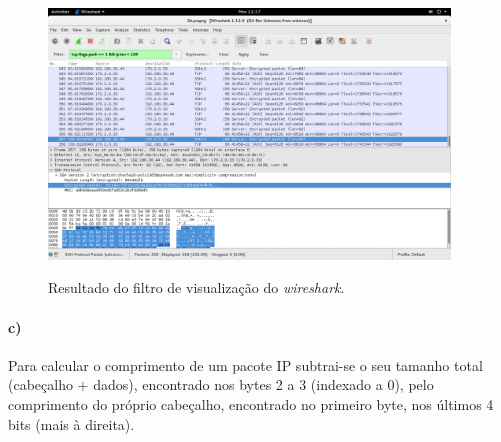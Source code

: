 \begin{figure}[h]
\centering
\includegraphics[width=0.95\textwidth, height=0.5\textheight]{3_b_screenshot.png}
\label{fig:wireshark}
\caption{Resultado do filtro de visualização do \emph{wireshark}.}
\end{figure}

\paragraph{c)}
Para calcular o comprimento de um pacote IP subtrai-se o seu tamanho total (cabeçalho + dados), encontrado nos bytes 2 a 3 (indexado a 0), pelo comprimento do próprio cabeçalho, encontrado no primeiro byte, nos últimos 4 bits (mais à direita).